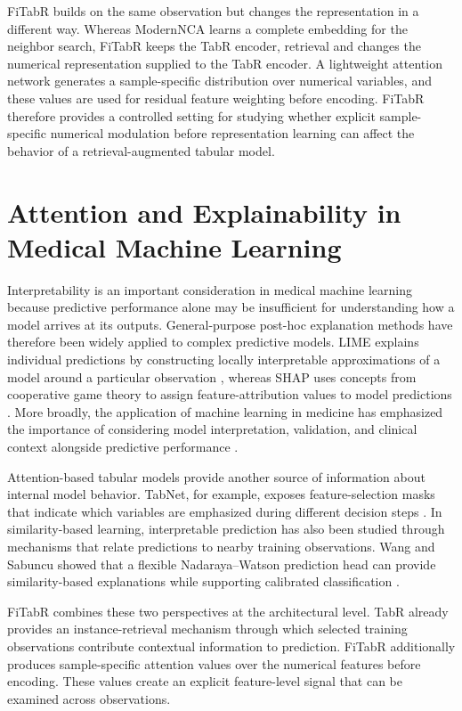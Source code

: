 \documentclass[11pt,a4paper,oneside, openany, reqno, chapter, nokorean]{oblivoir}
\theoremstyle{definition}
\theoremstyle{remark}
\numberwithin{equation}{chapter}
\theoremstyle{definition}
\theoremstyle{remark}
\theoremstyle{definition}
\begin{document}
FiTabR builds on the same observation but changes the representation in a
different way. Whereas ModernNCA learns a complete embedding for the neighbor
search, FiTabR keeps the TabR encoder, retrieval and changes
the numerical representation supplied to the TabR encoder. A lightweight
attention network generates a sample-specific distribution over numerical
variables, and these values are used for residual feature weighting before encoding. FiTabR therefore provides a
controlled setting for studying whether explicit sample-specific numerical
modulation before representation learning can affect the behavior of a
retrieval-augmented tabular model.


\section{Attention and Explainability in Medical Machine Learning}

Interpretability is an important consideration in medical machine learning
because predictive performance alone may be insufficient for understanding how
a model arrives at its outputs. General-purpose post-hoc explanation methods
have therefore been widely applied to complex predictive models. LIME explains
individual predictions by constructing locally interpretable approximations of
a model around a particular observation \cite{ribeiro2016lime}, whereas SHAP
uses concepts from cooperative game theory to assign feature-attribution values
to model predictions \cite{lundberg2017shap}. More broadly, the application of
machine learning in medicine has emphasized the importance of considering model
interpretation, validation, and clinical context alongside predictive
performance \cite{rajkomar2019mlmedicine}.

Attention-based tabular models provide another source of information about
internal model behavior. TabNet, for example, exposes feature-selection masks
that indicate which variables are emphasized during different decision steps
\cite{arik2021tabnet}. In similarity-based learning, interpretable prediction
has also been studied through mechanisms that relate predictions to nearby
training observations. Wang and Sabuncu showed that a flexible
Nadaraya--Watson prediction head can provide similarity-based explanations
while supporting calibrated classification
\cite{wang2023nadarayawatson}.

FiTabR combines these two perspectives at the architectural level. TabR already
provides an instance-retrieval mechanism through which selected training
observations contribute contextual information to prediction. FiTabR
additionally produces sample-specific attention values over the numerical
features before encoding. These values create an explicit feature-level signal
that can be examined across observations.
\end{document}
